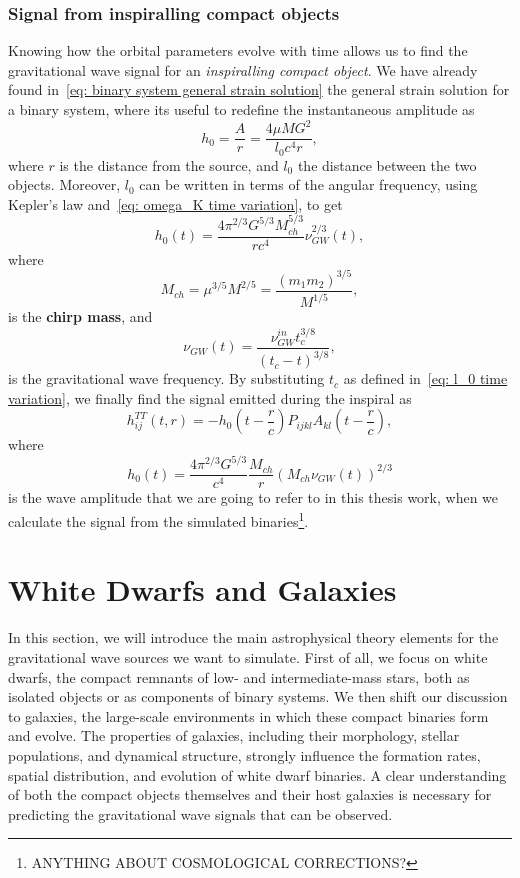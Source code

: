 \subsubsection{Signal from inspiralling compact objects}
Knowing how the orbital parameters evolve with time allows us to find the gravitational wave signal for an \textit{inspiralling compact object}.
We have already found in~\eqref{eq: binary system general strain solution} the general strain solution for a binary system, where its useful to redefine the instantaneous amplitude as
\[
    h_0 = \frac{A}{r} = \frac{4\mu M G^2}{l_0c^4r},
\]
where $r$ is the distance from the source, and $l_0$ the distance between the two objects.
Moreover, $l_0$ can be written in terms of the angular frequency, using Kepler's law and~\eqref{eq: omega_K time variation}, to get
\[
    h_0(t)=\frac{4\pi^{2/3}G^{5/3}M_{ch}^{5/3}}{rc^4}\nu_{GW}^{2/3}(t),
\]
where
\begin{equation}
    M_{ch} = \mu^{3/5}M^{2/5} = \frac{(m_1m_2)^{3/5}}{M^{1/5}},
    \label{eq: chirp mass definition}
\end{equation}
is the \textbf{chirp mass}, and 
\begin{equation}
    \nu_{GW}(t)=\frac{\nu_{GW}^{in}t_c^{3/8}}{(t_c-t)^{3/8}},
    \label{eq: nu time variation}
\end{equation}
is the gravitational wave frequency.
By substituting $t_c$ as defined in~\eqref{eq: l_0 time variation}, we finally find the signal emitted during the inspiral as
\begin{equation}
    h_{ij}^{TT}(t,r)= -h_0\left(t-\frac{r}{c}\right)P_{ijkl}A_{kl}\left(t-\frac{r}{c}\right),
    \label{eq: full inspiral signal}
\end{equation}
where
\begin{equation}
    \boxed{h_0(t)= \frac{4\pi^{2/3}G^{5/3}}{c^4}\frac{M_{ch}}{r}(M_{ch}\nu_{GW}(t))^{2/3}}
    \label{eq: the strain we use}
\end{equation}
is the wave amplitude that we are going to refer to in this thesis work, when we calculate the signal from the simulated binaries\footnote{ANYTHING ABOUT COSMOLOGICAL CORRECTIONS?}.

\section{White Dwarfs and Galaxies}
In this section, we will introduce the main astrophysical theory elements for the gravitational wave sources we want to simulate.
First of all, we focus on white dwarfs, the compact remnants of low- and intermediate-mass stars, both as isolated objects or as components of binary systems.  
We then shift our discussion to galaxies, the large-scale environments in which these compact binaries form and evolve. 
The properties of galaxies, including their morphology, stellar populations, and dynamical structure, strongly influence the formation rates, spatial distribution, and evolution of white dwarf binaries. 
A clear understanding of both the compact objects themselves and their host galaxies is necessary for predicting the gravitational wave signals that can be observed.

